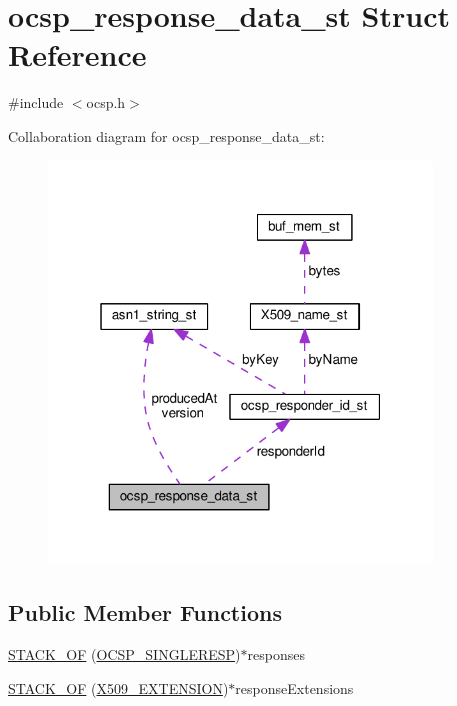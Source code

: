 \hypertarget{structocsp__response__data__st}{}\section{ocsp\+\_\+response\+\_\+data\+\_\+st Struct Reference}
\label{structocsp__response__data__st}


{\ttfamily \#include $<$ocsp.\+h$>$}



Collaboration diagram for ocsp\+\_\+response\+\_\+data\+\_\+st\+:
\nopagebreak
\begin{figure}[H]
\begin{center}
\leavevmode
\includegraphics[width=289pt]{structocsp__response__data__st__coll__graph}
\end{center}
\end{figure}
\subsection*{Public Member Functions}
\begin{DoxyCompactItemize}
\item 
\hyperlink{structocsp__response__data__st_a3c784868ab35de9ca683fcfccd4432ce}{S\+T\+A\+C\+K\+\_\+\+OF} (\hyperlink{ocsp_8h_a4a71db108c4230135b5df52537e65c3f}{O\+C\+S\+P\+\_\+\+S\+I\+N\+G\+L\+E\+R\+E\+SP})$\ast$responses
\item 
\hyperlink{structocsp__response__data__st_af4616df2b23f48495d29f945980b4fe0}{S\+T\+A\+C\+K\+\_\+\+OF} (\hyperlink{x509_8h_ab2f7f7dc0ced8684e0cbfc818e408304}{X509\+\_\+\+E\+X\+T\+E\+N\+S\+I\+ON})$\ast$response\+Extensions
\end{DoxyCompactItemize}
